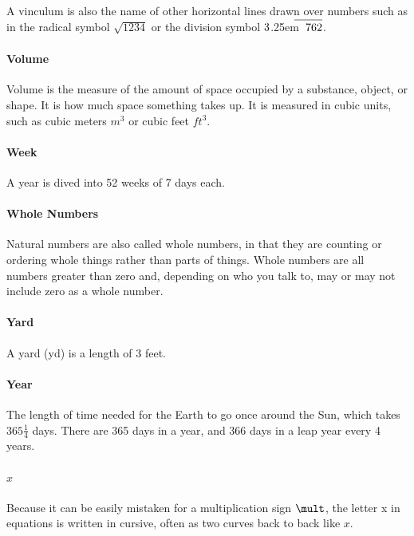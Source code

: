\documentclass[12pt]{article}
\newcommand\mylongdiv[2]{%
$\strut#1$\kern.25em\smash{\raise.3ex\hbox{$\big)$}}$\mkern-8mu\overline{\quad\strut#2}$}
\begin{document}
A vinculum is also the name of other horizontal lines drawn over numbers such as in the radical symbol \(\sqrt{1234}\) or the division symbol \mylongdiv{3}{762}.

\paragraph{Volume}
Volume is the measure of the amount of space occupied by a substance, object, or shape. It is how much space something takes up. It is measured in cubic units, such as cubic meters $m^3$ or cubic feet $ft^3$.

\paragraph{Week}
A year is dived into 52 weeks of 7 days each.

\paragraph{Whole Numbers}
Natural numbers are also called whole numbers, in that they are counting or ordering whole things rather than parts of things. Whole numbers are all numbers greater than zero and, depending on who you talk to, may or may not include zero as a whole number.

\paragraph{Yard}
A yard (yd) is a length of 3 feet.

\paragraph{Year}
The length of time needed for the Earth to go once around the Sun, which takes $365\frac{1}{4}$ days. There are 365 days in a year, and 366 days in a leap year every 4 years.

\paragraph{$x$}
Because it can be easily mistaken for a multiplication sign $\mult$, the letter x in equations is written in cursive, often as two curves back to back like $x$.
\end{document}
